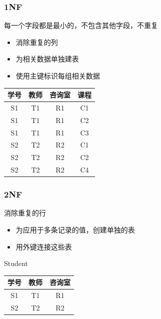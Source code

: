 \documentclass[11pt,journal,compsoc]{IEEEtran}
\begin{document}
\subsubsection{1NF}

每一个字段都是最小的，不包含其他字段，不重复

\begin{itemize}
    \item 消除重复的列
    \item 为相关数据单独建表
    \item 使用主键标识每组相关数据
\end{itemize}

\begin{table}[H]
    \centering
    \begin{tabular}{|c|c|c|c|}
        \hline
        学号 & 教师 & 咨询室 & 课程 \\
        \hline
        S1 & T1 & R1 & C1 \\
        \hline
        S1 & T1 & R1 & C2 \\
        \hline
        S1 & T1 & R1 & C3 \\
        \hline
        S2 & T2 & R2 & C1 \\
        \hline
        S2 & T2 & R2 & C2 \\
        \hline
        S2 & T2 & R2 & C4 \\
        \hline
    \end{tabular}
\end{table}


\subsubsection{2NF}

消除重复的行

\begin{itemize}
    \item 为应用于多条记录的值，创建单独的表
    \item 用外键连接这些表
\end{itemize}

Student

\begin{table}[H]
    \centering
    \begin{tabular}{|c|c|c|}
        \hline
        学号 & 教师 & 咨询室 \\
        \hline
        S1 & T1 & R1 \\
        \hline
        S2 & T2 & R2 \\
        \hline
    \end{tabular}
\end{table}
\end{document}
